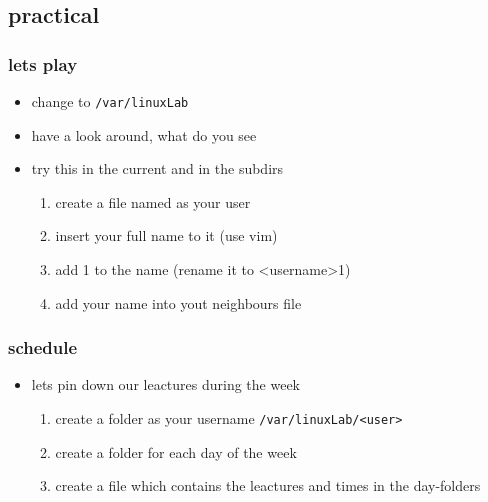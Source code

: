 \documentclass[handout]{beamer}
\newcommand{\code}[1]{\colorbox{lGray}{\texttt{#1}}}
\begin{document}
    \subsection{practical}
        \begin{frame}
			\frametitle{lets play}
			\begin{itemize}
                \item<1-> change to \code{/var/linuxLab}
                \item<2-> have a look around, what do you see
                \item<3-> try this in the current and in the subdirs
                \begin{enumerate}
                    \item<4-> create a file named as your user 
                    \item<4-> insert your full name to it (use vim)
                    \item<5-> add 1 to the name (rename it to \textless username\textgreater 1)
                    \item<6-> add your name into yout neighbours file
                \end{enumerate}
            \end{itemize}
		\end{frame}
        \begin{frame}
			\frametitle{schedule}
			\begin{itemize}
                \item<1-> lets pin down our leactures during the week
                \begin{enumerate}
                    \item<1-> create a folder as your username \code{/var/linuxLab/\textless user\textgreater}
                    \item<2-> create a folder for each day of the week
                    \item<3-> create a file which contains the leactures and times in the day-folders
                \end{enumerate}
            \end{itemize}
		\end{frame}
\end{document}
